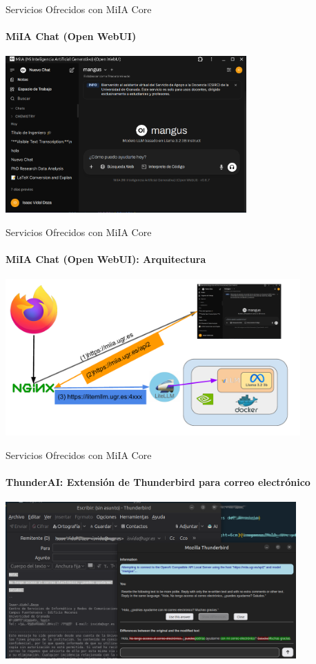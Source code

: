 \documentclass[aspectratio=169]{beamer}
\begin{document}
\begin{frame}{Servicios Ofrecidos con MiIA Core}
    \framesubtitle{MiIA Chat (\textbf{Open WebUI})}

    \begin{center}
        \includegraphics[height=6cm]{imagenes/MiIA_chat.png}
    \end{center}

\end{frame}

\begin{frame}{Servicios Ofrecidos con MiIA Core}
    \framesubtitle{MiIA Chat (\textbf{Open WebUI}): Arquitectura}

    \begin{center}
        \includegraphics[height=6cm]{imagenes/MiIA_chat_arch.pdf}
    \end{center}

\end{frame}

\begin{frame}{Servicios Ofrecidos con MiIA Core}
    \framesubtitle{\textbf{ThunderAI}: Extensión de Thunderbird para correo electrónico}

    \begin{center}
        \includegraphics[height=6cm]{imagenes/thunderAI.png}
    \end{center}

\end{frame}
\end{document}

